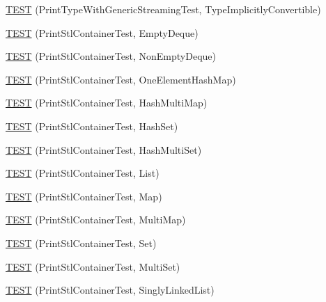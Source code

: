 \begin{DoxyCompactItemize}
\item 
\mbox{\hyperlink{namespacetesting_1_1gtest__printers__test_a68877c5e1ec7a53281798310c30e1776}{T\+E\+ST}} (Print\+Type\+With\+Generic\+Streaming\+Test, Type\+Implicitly\+Convertible)
\item 
\mbox{\hyperlink{namespacetesting_1_1gtest__printers__test_a1ce10b8a3634e0f6bfbfbb5888c04a95}{T\+E\+ST}} (Print\+Stl\+Container\+Test, Empty\+Deque)
\item 
\mbox{\hyperlink{namespacetesting_1_1gtest__printers__test_a249d482cf4a1525bd043489dcbd3e200}{T\+E\+ST}} (Print\+Stl\+Container\+Test, Non\+Empty\+Deque)
\item 
\mbox{\hyperlink{namespacetesting_1_1gtest__printers__test_a698cb873ab0fad7484c4d27ee4d8c033}{T\+E\+ST}} (Print\+Stl\+Container\+Test, One\+Element\+Hash\+Map)
\item 
\mbox{\hyperlink{namespacetesting_1_1gtest__printers__test_a794a880a6ebe2ce3a32fc437dd818aa3}{T\+E\+ST}} (Print\+Stl\+Container\+Test, Hash\+Multi\+Map)
\item 
\mbox{\hyperlink{namespacetesting_1_1gtest__printers__test_aad3a8ebfcf21b20b62fc262cc182d7d5}{T\+E\+ST}} (Print\+Stl\+Container\+Test, Hash\+Set)
\item 
\mbox{\hyperlink{namespacetesting_1_1gtest__printers__test_aa21c6c92358c76b7eee93b8329023c47}{T\+E\+ST}} (Print\+Stl\+Container\+Test, Hash\+Multi\+Set)
\item 
\mbox{\hyperlink{namespacetesting_1_1gtest__printers__test_aaa135672ff79ecaef82c6046f2ab8d29}{T\+E\+ST}} (Print\+Stl\+Container\+Test, List)
\item 
\mbox{\hyperlink{namespacetesting_1_1gtest__printers__test_a3d701a1866f260a42411e9041894c49c}{T\+E\+ST}} (Print\+Stl\+Container\+Test, Map)
\item 
\mbox{\hyperlink{namespacetesting_1_1gtest__printers__test_a8a498c956a5b1c0358d126e1ad56fac0}{T\+E\+ST}} (Print\+Stl\+Container\+Test, Multi\+Map)
\item 
\mbox{\hyperlink{namespacetesting_1_1gtest__printers__test_abdc498462741033074f8e86b7c0bd480}{T\+E\+ST}} (Print\+Stl\+Container\+Test, Set)
\item 
\mbox{\hyperlink{namespacetesting_1_1gtest__printers__test_adaa3e1cfa3feca377b3958edb41fc0f1}{T\+E\+ST}} (Print\+Stl\+Container\+Test, Multi\+Set)
\item 
\mbox{\hyperlink{namespacetesting_1_1gtest__printers__test_a88b9d0933ffdf889fadfe8fc7511b565}{T\+E\+ST}} (Print\+Stl\+Container\+Test, Singly\+Linked\+List)
\item 

\end{DoxyCompactItemize}
